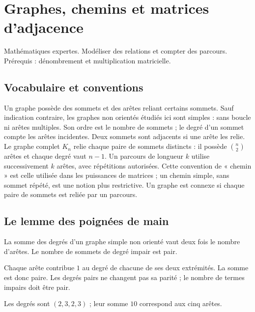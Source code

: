 \documentclass[../cours_tle.tex]{subfiles}
\begin{document}
\setcounter{chapter}{33}
\chapter{Graphes, chemins et matrices d’adjacence}
\label{ch:34}
\begin{objectif}
Mathématiques expertes. Modéliser des relations et compter des parcours. Prérequis : dénombrement et multiplication matricielle.
\end{objectif}
\section{Vocabulaire et conventions}
Un graphe possède des sommets et des arêtes reliant certains sommets. Sauf indication contraire, les graphes non orientés étudiés ici sont simples : sans boucle ni arêtes multiples.
Son ordre est le nombre de sommets ; le degré d'un sommet compte les arêtes incidentes. Deux sommets sont adjacents si une arête les relie.
Le graphe complet $K_n$ relie chaque paire de sommets distincts : il possède $\binom n2$ arêtes et chaque degré vaut $n-1$.
Un parcours de longueur $k$ utilise successivement $k$ arêtes, avec répétitions autorisées. Cette convention de « chemin » est celle utilisée dans les puissances de matrices ; un chemin simple, sans sommet répété, est une notion plus restrictive.
Un graphe est connexe si chaque paire de sommets est reliée par un parcours.
\section{Le lemme des poignées de main}
\begin{propriete}
La somme des degrés d'un graphe simple non orienté vaut deux fois le nombre d'arêtes. Le nombre de sommets de degré impair est pair.
\end{propriete}
\begin{demonstration}
Chaque arête contribue $1$ au degré de chacune de ses deux extrémités. La somme est donc paire. Les degrés pairs ne changent pas sa parité ; le nombre de termes impairs doit être pair.
\end{demonstration}
\begin{center}
\end{center}
Les degrés sont $(2,3,2,3)$ ; leur somme $10$ correspond aux cinq arêtes.
\end{document}
